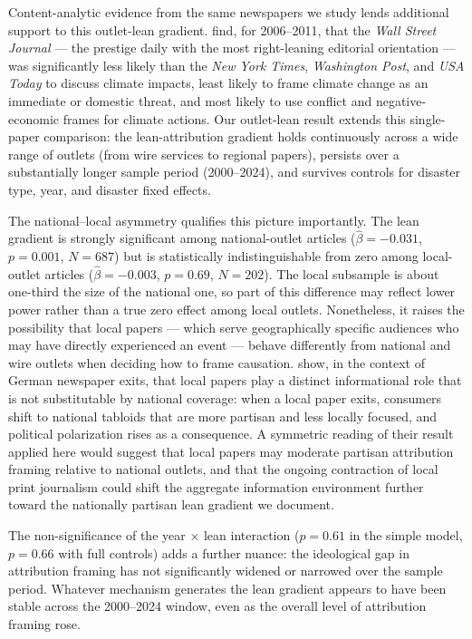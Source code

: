 \documentclass[12pt]{article}
\begin{document}
Content-analytic evidence from the same newspapers we study lends
additional support to this outlet-lean gradient.  \citet{feldman2017}
find, for 2006--2011, that the \emph{Wall Street Journal} --- the
prestige daily with the most right-leaning editorial orientation ---
was significantly less likely than the \emph{New York Times},
\emph{Washington Post}, and \emph{USA Today} to discuss climate
impacts, least likely to frame climate change as an immediate or
domestic threat, and most likely to use conflict and negative-economic
frames for climate actions.  Our outlet-lean result extends this
single-paper comparison: the lean-attribution gradient holds
continuously across a wide range of outlets (from wire services to
regional papers), persists over a substantially longer sample period
(2000--2024), and survives controls for disaster type, year, and
disaster fixed effects.

The national--local asymmetry qualifies this picture importantly.  The
lean gradient is strongly significant among national-outlet articles
($\hat\beta = -0.031$, $p=0.001$, $N=687$) but is statistically
indistinguishable from zero among local-outlet articles
($\hat\beta = -0.003$, $p=0.69$, $N=202$).  The local subsample is
about one-third the size of the national one, so part of this
difference may reflect lower power rather than a true zero effect among
local outlets.  Nonetheless, it raises the possibility that local
papers --- which serve geographically specific audiences who may have
directly experienced an event --- behave differently from national and
wire outlets when deciding how to frame causation.  \citet{ellger2024}
show, in the context of German newspaper exits, that local papers play
a distinct informational role that is not substitutable by national
coverage: when a local paper exits, consumers shift to national
tabloids that are more partisan and less locally focused, and political
polarization rises as a consequence.  A symmetric reading of their
result applied here would suggest that local papers may moderate
partisan attribution framing relative to national outlets, and that the
ongoing contraction of local print journalism could shift the
aggregate information environment further toward the nationally
partisan lean gradient we document.

The non-significance of the year $\times$ lean interaction
($p = 0.61$ in the simple model, $p = 0.66$ with full controls) adds a
further nuance: the ideological gap in attribution framing has not
significantly widened or narrowed over the sample period.  Whatever
mechanism generates the lean gradient appears to have been stable
across the 2000--2024 window, even as the overall level of attribution
framing rose.
\end{document}
